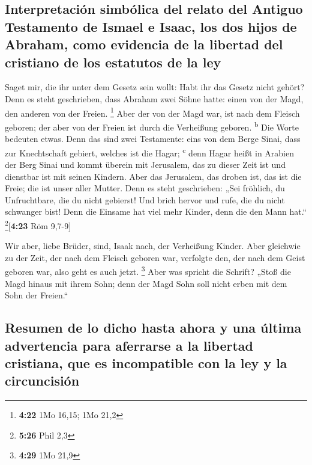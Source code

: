 \hypertarget{interpretaciuxf3n-simbuxf3lica-del-relato-del-antiguo-testamento-de-ismael-e-isaac-los-dos-hijos-de-abraham-como-evidencia-de-la-libertad-del-cristiano-de-los-estatutos-de-la-ley}{%
\subsection{Interpretación simbólica del relato del Antiguo Testamento
de Ismael e Isaac, los dos hijos de Abraham, como evidencia de la
libertad del cristiano de los estatutos de la
ley}\label{interpretaciuxf3n-simbuxf3lica-del-relato-del-antiguo-testamento-de-ismael-e-isaac-los-dos-hijos-de-abraham-como-evidencia-de-la-libertad-del-cristiano-de-los-estatutos-de-la-ley}}

 Saget mir, die ihr unter dem Gesetz sein wollt: Habt ihr
das Gesetz nicht gehört?  Denn es steht geschrieben, dass
Abraham zwei Söhne hatte: einen von der Magd, den anderen von der
Freien. \footnote{\textbf{4:22} 1Mo 16,15; 1Mo 21,2} 
Aber der von der Magd war, ist nach dem Fleisch geboren; der aber von
der Freien ist durch die Verheißung geboren. \textsuperscript{b}
 Die Worte bedeuten etwas. Denn das sind zwei Testamente:
eins von dem Berge Sinai, dass zur Knechtschaft gebiert, welches ist die
Hagar; \textsuperscript{c}  denn Hagar heißt in Arabien
der Berg Sinai und kommt überein mit Jerusalem, das zu dieser Zeit ist
und dienstbar ist mit seinen Kindern.  Aber das
Jerusalem, das droben ist, das ist die Freie; die ist unser aller
Mutter.  Denn es steht geschrieben: „Sei fröhlich, du
Unfruchtbare, die du nicht gebierst! Und brich hervor und rufe, die du
nicht schwanger bist! Denn die Einsame hat viel mehr Kinder, denn die
den Mann hat.`` \footnote{\textbf{5:26} Phil 2,3}{[}\textbf{4:23} Röm
9,7-9{]}

 Wir aber, liebe Brüder, sind, Isaak nach, der Verheißung
Kinder.  Aber gleichwie zu der Zeit, der nach dem Fleisch
geboren war, verfolgte den, der nach dem Geist geboren war, also geht es
auch jetzt. \footnote{\textbf{4:29} 1Mo 21,9}  Aber was
spricht die Schrift? „Stoß die Magd hinaus mit ihrem Sohn; denn der Magd
Sohn soll nicht erben mit dem Sohn der Freien.``

\hypertarget{resumen-de-lo-dicho-hasta-ahora-y-una-uxfaltima-advertencia-para-aferrarse-a-la-libertad-cristiana-que-es-incompatible-con-la-ley-y-la-circuncisiuxf3n}{%
\subsection{Resumen de lo dicho hasta ahora y una última advertencia
para aferrarse a la libertad cristiana, que es incompatible con la ley y
la
circuncisión}\label{resumen-de-lo-dicho-hasta-ahora-y-una-uxfaltima-advertencia-para-aferrarse-a-la-libertad-cristiana-que-es-incompatible-con-la-ley-y-la-circuncisiuxf3n}}

